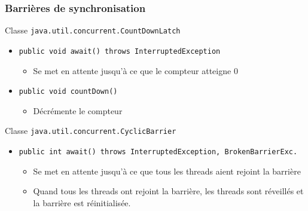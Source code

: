
\begingroup

\begin{frame} 
  \frametitle{Barrières de synchronisation}

  \begin{exampleblock}{Classe \lstinline+java.util.concurrent.CountDownLatch+}
    \begin{itemize}
    \item \lstinline+public void await() throws InterruptedException+\\
      \begin{itemize}
      \item Se met en attente jusqu'à ce que le compteur atteigne 0
      \end{itemize}
      \medskip
    \item \lstinline+public void countDown()+\\
      \begin{itemize}
      \item Décrémente le compteur
      \end{itemize}
    \end{itemize}
  \end{exampleblock}

  \bigskip
  
  \begin{exampleblock}{Classe \lstinline{java.util.concurrent.CyclicBarrier}}
    \begin{itemize}
    \item\lstinline{public int await() throws InterruptedException, BrokenBarrierExc.}\\
      \begin{itemize}
      \item Se met en attente jusqu'à ce que tous les threads aient rejoint la barrière
      \item Quand tous les threads ont rejoint la barrière, les threads sont réveillés et la barrière est réinitialisée.
      \end{itemize}
    \end{itemize}
  \end{exampleblock}
  
\end{frame}

\endgroup
\endinput
